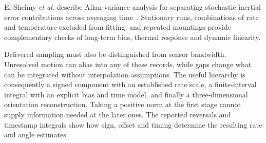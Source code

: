 El-Sheimy \emph{et al.} describe Allan-variance analysis for separating stochastic inertial error contributions across averaging time~\cite{elsheimy2008}. Stationary runs, combinations of rate and temperature excluded from fitting, and repeated mountings provide complementary checks of long-term bias, thermal response and dynamic linearity.

Delivered sampling must also be distinguished from sensor bandwidth. Unresolved motion can alias into any of these records, while gaps change what can be integrated without interpolation assumptions. The useful hierarchy is consequently a signed component with an established rate scale, a finite-interval integral with an explicit bias and time model, and finally a three-dimensional orientation reconstruction. Taking a positive norm at the first stage cannot supply information needed at the later ones. The reported reversals and timestamp integrals show how sign, offset and timing determine the resulting rate and angle estimates.
